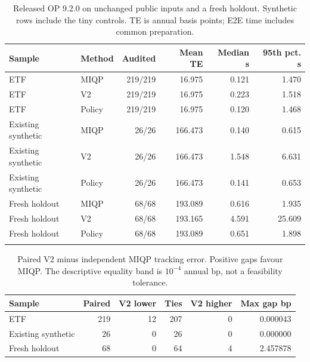 \begin{table}[htbp]\centering\small\setlength{\tabcolsep}{4pt}
\caption{Released OP 9.2.0 on unchanged public inputs and a fresh holdout. Synthetic rows include the tiny controls. TE is annual basis points; E2E time includes common preparation.}\label{tab:matched}\label{tab:joint}
\begin{tabular}{llrrrr}\toprule
Sample & Method & Audited & Mean TE & Median s & 95th pct. s\\\midrule
ETF & MIQP & 219/219 & 16.975 & 0.121 & 1.470\\
ETF & V2 & 219/219 & 16.975 & 0.223 & 1.518\\
ETF & Policy & 219/219 & 16.975 & 0.120 & 1.468\\
\addlinespace
Existing synthetic & MIQP & 26/26 & 166.473 & 0.140 & 0.615\\
Existing synthetic & V2 & 26/26 & 166.473 & 1.548 & 6.631\\
Existing synthetic & Policy & 26/26 & 166.473 & 0.141 & 0.653\\
\addlinespace
Fresh holdout & MIQP & 68/68 & 193.089 & 0.616 & 1.935\\
Fresh holdout & V2 & 68/68 & 193.165 & 4.591 & 25.609\\
Fresh holdout & Policy & 68/68 & 193.089 & 0.651 & 1.898\\
\addlinespace
\bottomrule\end{tabular}\end{table}
\begin{table}[htbp]\centering\small\setlength{\tabcolsep}{4pt}
\caption{Paired V2 minus independent MIQP tracking error. Positive gaps favour MIQP. The descriptive equality band is $10^{-4}$ annual bp, not a feasibility tolerance.}\label{tab:paired}
\begin{tabular}{lrrrrr}\toprule
Sample & Paired & V2 lower & Ties & V2 higher & Max gap bp\\\midrule
ETF & 219 & 12 & 207 & 0 & 0.000043\\
Existing synthetic & 26 & 0 & 26 & 0 & 0.000000\\
Fresh holdout & 68 & 0 & 64 & 4 & 2.457878\\
\bottomrule\end{tabular}\end{table}
